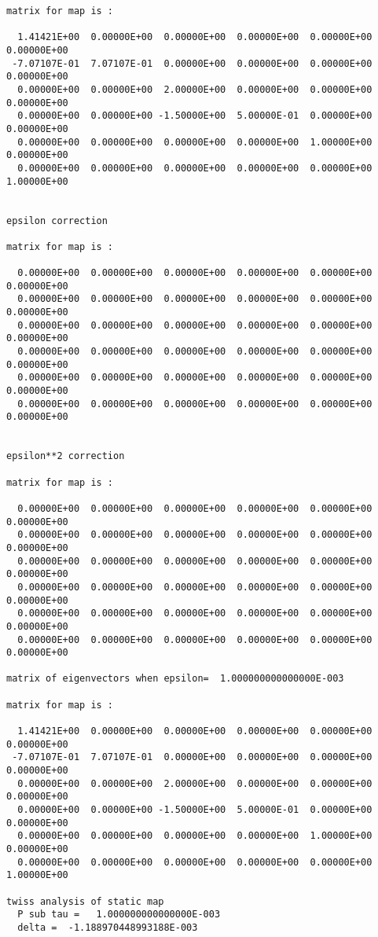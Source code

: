 \begin{footnotesize}
\begin{verbatim}
matrix for map is :

  1.41421E+00  0.00000E+00  0.00000E+00  0.00000E+00  0.00000E+00  0.00000E+00
 -7.07107E-01  7.07107E-01  0.00000E+00  0.00000E+00  0.00000E+00  0.00000E+00
  0.00000E+00  0.00000E+00  2.00000E+00  0.00000E+00  0.00000E+00  0.00000E+00
  0.00000E+00  0.00000E+00 -1.50000E+00  5.00000E-01  0.00000E+00  0.00000E+00
  0.00000E+00  0.00000E+00  0.00000E+00  0.00000E+00  1.00000E+00  0.00000E+00
  0.00000E+00  0.00000E+00  0.00000E+00  0.00000E+00  0.00000E+00  1.00000E+00


epsilon correction

matrix for map is :

  0.00000E+00  0.00000E+00  0.00000E+00  0.00000E+00  0.00000E+00  0.00000E+00
  0.00000E+00  0.00000E+00  0.00000E+00  0.00000E+00  0.00000E+00  0.00000E+00
  0.00000E+00  0.00000E+00  0.00000E+00  0.00000E+00  0.00000E+00  0.00000E+00
  0.00000E+00  0.00000E+00  0.00000E+00  0.00000E+00  0.00000E+00  0.00000E+00
  0.00000E+00  0.00000E+00  0.00000E+00  0.00000E+00  0.00000E+00  0.00000E+00
  0.00000E+00  0.00000E+00  0.00000E+00  0.00000E+00  0.00000E+00  0.00000E+00


epsilon**2 correction

matrix for map is :

  0.00000E+00  0.00000E+00  0.00000E+00  0.00000E+00  0.00000E+00  0.00000E+00
  0.00000E+00  0.00000E+00  0.00000E+00  0.00000E+00  0.00000E+00  0.00000E+00
  0.00000E+00  0.00000E+00  0.00000E+00  0.00000E+00  0.00000E+00  0.00000E+00
  0.00000E+00  0.00000E+00  0.00000E+00  0.00000E+00  0.00000E+00  0.00000E+00
  0.00000E+00  0.00000E+00  0.00000E+00  0.00000E+00  0.00000E+00  0.00000E+00
  0.00000E+00  0.00000E+00  0.00000E+00  0.00000E+00  0.00000E+00  0.00000E+00

matrix of eigenvectors when epsilon=  1.000000000000000E-003

matrix for map is :

  1.41421E+00  0.00000E+00  0.00000E+00  0.00000E+00  0.00000E+00  0.00000E+00
 -7.07107E-01  7.07107E-01  0.00000E+00  0.00000E+00  0.00000E+00  0.00000E+00
  0.00000E+00  0.00000E+00  2.00000E+00  0.00000E+00  0.00000E+00  0.00000E+00
  0.00000E+00  0.00000E+00 -1.50000E+00  5.00000E-01  0.00000E+00  0.00000E+00
  0.00000E+00  0.00000E+00  0.00000E+00  0.00000E+00  1.00000E+00  0.00000E+00
  0.00000E+00  0.00000E+00  0.00000E+00  0.00000E+00  0.00000E+00  1.00000E+00

twiss analysis of static map
  P sub tau =   1.000000000000000E-003
  delta =  -1.188970448993188E-003


\end{verbatim}
\end{footnotesize}
